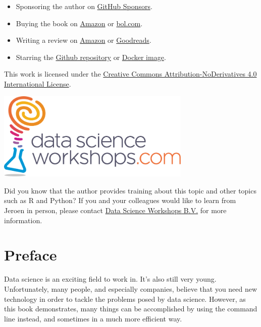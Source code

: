 \documentclass[
]{book}
\providecommand{\tightlist}{%
  \setlength{\itemsep}{0pt}\setlength{\parskip}{0pt}}
\theoremstyle{definition}
\theoremstyle{definition}
\theoremstyle{definition}
\theoremstyle{remark}
\begin{document}
\begin{itemize}
\tightlist
\item
  Sponsoring the author on \href{https://github.com/sponsors/jeroenjanssens/}{GitHub Sponsors}.
\item
  Buying the book on \href{https://www.amazon.com/Data-Science-Command-Line-Time-Tested/dp/1491947853}{Amazon} or \href{https://www.bol.com/nl/p/data-science-at-the-command-line/9200000031673818}{bol.com}.
\item
  Writing a review on \href{https://www.amazon.com/Data-Science-Command-Line-Time-Tested/dp/1491947853}{Amazon} or \href{https://www.goodreads.com/book/show/22967424-data-science-at-the-command-line}{Goodreads}.
\item
  Starring the \href{https://github.com/jeroenjanssens/data-science-at-the-command-line}{Github repository} or \href{https://hub.docker.com/u/datascienceworkshops/}{Docker image}.
\end{itemize}

This work is licensed under the \href{https://creativecommons.org/licenses/by-nd/4.0/}{Creative Commons Attribution-NoDerivatives 4.0 International License}.

\begin{center}\includegraphics[width=350px]{images/data-science-workshops} \end{center}

Did you know that the author provides training about this topic and other topics such as R and Python? If you and your colleagues would like to learn from Jeroen in person, please contact \href{https://www.datascienceworkshops.com}{Data Science Workshops B.V.} for more information.

\hypertarget{preface}{%
\chapter*{Preface}\label{preface}}

Data science is an exciting field to work in. It's also still very young. Unfortunately, many people, and especially companies, believe that you need new technology in order to tackle the problems posed by data science. However, as this book demonstrates, many things can be accomplished by using the command line instead, and sometimes in a much more efficient way.
\end{document}
